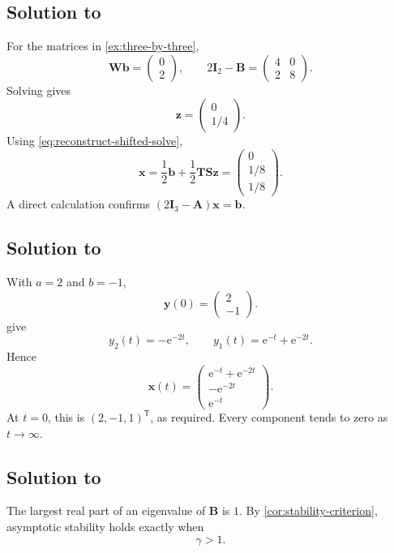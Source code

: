 \documentclass[11pt]{article}
\newcommand{\I}{\mathbf{I}}
\newcommand{\mat}[1]{\mathbf{#1}}
\newcommand{\vect}[1]{\mathbf{#1}}
\newcommand{\e}{\mathrm{e}}
\theoremstyle{definition}
\theoremstyle{remark}
\begin{document}
\subsection*{Solution to }

For the matrices in \cref{ex:three-by-three},
\[
  \mat{W}\vect{b}
  =
  \begin{pmatrix}0\\2\end{pmatrix},
  \qquad
  2\I_2-\mat{B}
  =
  \begin{pmatrix}
    4&0\\
    2&8
  \end{pmatrix}.
\]
Solving gives
\[
  \vect{z}
  =
  \begin{pmatrix}0\\1/4\end{pmatrix}.
\]
Using \cref{eq:reconstruct-shifted-solve},
\[
  \vect{x}
  =\frac12\vect{b}
   +\frac12\mat{T}\mat{S}\vect{z}
  =
  \begin{pmatrix}
    0\\1/8\\1/8
  \end{pmatrix}.
\]
A direct calculation confirms
\((2\I_3-\mat{A})\vect{x}=\vect{b}\).

\subsection*{Solution to }

With \(a=2\) and \(b=-1\),
\[
  \vect{y}(0)=
  \begin{pmatrix}2\\-1\end{pmatrix}.
\]
 give
\[
  y_2(t)=-\e^{-2t},
  \qquad
  y_1(t)=\e^{-t}+\e^{-2t}.
\]
Hence
\[
  \vect{x}(t)
  =
  \begin{pmatrix}
    \e^{-t}+\e^{-2t}\\
    -\e^{-2t}\\
    \e^{-t}
  \end{pmatrix}.
\]
At \(t=0\), this is \((2,-1,1)^{\mathsf T}\), as required. Every component tends to zero as \(t\to\infty\).

\subsection*{Solution to }

The largest real part of an eigenvalue of \(\mat{B}\) is \(1\). By
\cref{cor:stability-criterion}, asymptotic stability holds exactly when
\[
  \gamma>1.
\]
\end{document}
